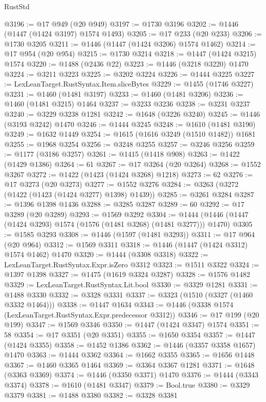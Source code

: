 \begin{lexlean}{RustStd}
\begin{coremodule}
@3196 := @17 @949 (@20 @949)
@3197 := @1730 @3196
@3202 := @1446 (@1447 (@1424 @3197) @1574 @1493)
@3205 := @17 @233 (@20 @233)
@3206 := @1730 @3205
@3211 := @1446 (@1447 (@1424 @3206) @1574 @1462)
@3214 := @17 @954 (@20 @954)
@3215 := @1730 @3214
@3218 := @1447 (@1424 @3215) @1574
@3220 := @1488 (@2436 @22)
@3223 := @1446 (@3218 @3220) @1470
@3224 := @3211 @3223
@3225 := @3202 @3224
@3226 := @1444 @3225
@3227 := LexLeanTarget.RustSyntax.Item.sliceBytes
@3229 := @1455 (@1746 @3227)
@3231 := @1460 (@1481 @3197)
@3233 := @1460 (@1481 @3206)
@3236 := @1460 (@1481 @3215) @1464
@3237 := @3233 @3236
@3238 := @3231 @3237
@3240 := @3229 @3238 @1281
@3242 := @1648 (@3226 @3240)
@3245 := @1446 (@3193 @3242) @1470
@3246 := @1444 @3245
@3248 := @1610 (@1481 @3190)
@3249 := @1632 @1449
@3254 := @1615 (@1616 @3249 (@1510 @1482)) @1681
@3255 := @1968 @3254
@3256 := @3248 @3255
@3257 := @3246 @3256
@3259 := @1177 (@3186 @3257)
@3261 := @1415 (@1418 @908)
@3263 := @1422 (@1429 @1386)
@3264 := 61
@3267 := @17 @3264 (@20 @3264)
@3268 := @1552 @3267
@3272 := @1422 (@1423 (@1424 @3268) @1218)
@3273 := 62
@3276 := @17 @3273 (@20 @3273)
@3277 := @1552 @3276
@3284 := @3263 (@3272 (@1422 (@1423 (@1424 @3277) @1398) @1439))
@3285 := @3261 @3284
@3287 := @1396 @1398 @1436
@3288 := @3285 @3287
@3289 := 60
@3292 := @17 @3289 (@20 @3289)
@3293 := @1569 @3292
@3304 := @1444 (@1446 (@1447 (@1424 @3293) @1574 (@1576 (@1481 @3268) (@1481 @3277))) @1470)
@3305 := @1585 @3293
@3308 := @1446 (@1597 (@1481 @3293))
@3311 := @17 @964 (@20 @964)
@3312 := @1569 @3311
@3318 := @1446 (@1447 (@1424 @3312) @1574 @1462) @1470
@3320 := @1444 (@3308 @3318)
@3322 := LexLeanTarget.RustSyntax.Expr.isZero @3312
@3323 := @1511 @3322
@3324 := @1397 @1398
@3327 := @1475 (@1619 @3324 @3287)
@3328 := @1576 @1482
@3329 := LexLeanTarget.RustSyntax.Lit.bool
@3330 := @3329 @1281
@3331 := @1488 @3330
@3332 := @3328 @3331
@3337 := @3323 (@1510 (@3327 (@1460 @3332 @1464)))
@3338 := @1447 @1634
@3343 := @1446 (@3338 @1574 (LexLeanTarget.RustSyntax.Expr.predecessor @3312))
@3346 := @17 @199 (@20 @199)
@3347 := @1569 @3346
@3350 := @1447 (@1424 @3347) @1574
@3351 := 58
@3354 := @17 @3351 (@20 @3351)
@3355 := @1650 @3354
@3357 := @1447 (@1424 @3355)
@3358 := @1452 @1386
@3362 := @1446 (@3357 @3358 @1657) @1470
@3363 := @1444 @3362
@3364 := @1662 @3355
@3365 := @1656 @1448
@3367 := @1460 @3365 @1464
@3369 := @3364 @3367 @1281
@3371 := @1648 (@3363 @3369)
@3374 := @1446 (@3350 @3371) @1470
@3376 := @1444 (@3343 @3374)
@3378 := @1610 (@1481 @3347)
@3379 := Bool.true
@3380 := @3329 @3379
@3381 := @1488 @3380
@3382 := @3328 @3381

\end{coremodule}
\end{lexlean}
